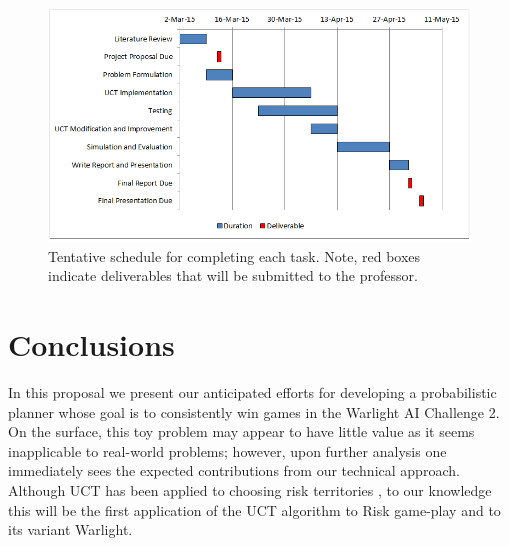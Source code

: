 \documentclass[a4paper,11pt]{article}
\begin{document}
%
\begin{figure}[htbp]
  \centering
  \includegraphics[width=0.95\columnwidth]{gantt_chart}
  \caption{Tentative schedule for completing each task. Note, red boxes indicate deliverables that will be submitted to the professor.}
  \label{fig:schedule}
\end{figure}


%
\section{Conclusions}\label{sec:conclusions}
In this proposal we present our anticipated efforts for developing a probabilistic planner whose goal is to consistently win games in the Warlight AI Challenge 2. On the surface, this toy problem may appear to have little value as it seems inapplicable to real-world problems; however, upon further analysis one immediately sees the expected contributions from our technical approach.  Although UCT has been applied to choosing risk territories \cite{riskalb}, to our knowledge this will be the first application of the UCT algorithm to Risk game-play and to its variant Warlight. 




\end{document}

